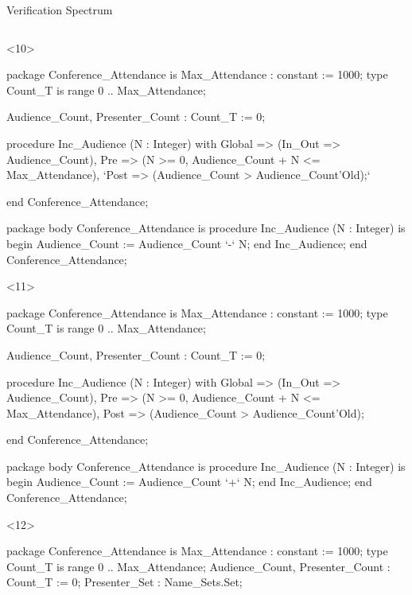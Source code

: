 \documentclass{beamer}
\begin{document}
\begin{frame}[fragile]{Verification Spectrum}
\begin{columns}
\begin{column}{9cm}
      \begin{onlyenv}<10>
      \begin{pxcode}[language=SPARK,style=magic,gobble=8]
        package Conference_Attendance
        is
           Max_Attendance : constant := 1000;
           type Count_T is range 0 .. Max_Attendance;

           Audience_Count, Presenter_Count : Count_T := 0;

           procedure Inc_Audience (N : Integer)
           with Global => (In_Out => Audience_Count),
                Pre    => (N >= 0, Audience_Count + N <= Max_Attendance),
                `Post   => (Audience_Count > Audience_Count'Old);`

        end Conference_Attendance;

        package body Conference_Attendance
        is
           procedure Inc_Audience (N : Integer)
           is
           begin
              Audience_Count := Audience_Count `-` N;
           end Inc_Audience;
        end Conference_Attendance;
      \end{pxcode}
      \end{onlyenv}

      \begin{onlyenv}<11>
      \begin{pxcode}[language=SPARK,style=magic,gobble=8]
        package Conference_Attendance
        is
           Max_Attendance : constant := 1000;
           type Count_T is range 0 .. Max_Attendance;

           Audience_Count, Presenter_Count : Count_T := 0;

           procedure Inc_Audience (N : Integer)
           with Global => (In_Out => Audience_Count),
                Pre    => (N >= 0, Audience_Count + N <= Max_Attendance),
                Post   => (Audience_Count > Audience_Count'Old);

        end Conference_Attendance;

        package body Conference_Attendance
        is
           procedure Inc_Audience (N : Integer)
           is
           begin
              Audience_Count := Audience_Count `+` N;
           end Inc_Audience;
        end Conference_Attendance;
      \end{pxcode}
      \end{onlyenv}


      \begin{onlyenv}<12>
      \begin{pxcode}[language=SPARK,style=magic,gobble=8]
        package Conference_Attendance
        is
           Max_Attendance : constant := 1000;
           type Count_T is range 0 .. Max_Attendance;
           Audience_Count, Presenter_Count : Count_T := 0;
           Presenter_Set : Name_Sets.Set;


\end{pxcode}
\end{onlyenv}
\end{column}
\end{columns}
\end{frame}
\end{document}
